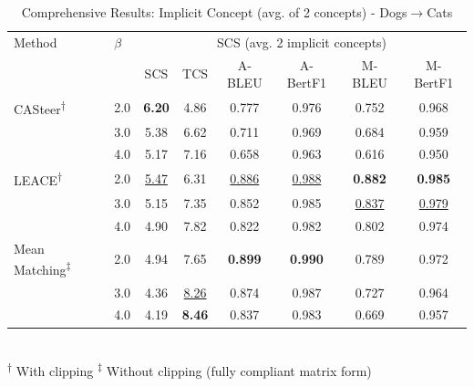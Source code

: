 \begin{table}[htbp]
\centering
\caption{Comprehensive Results: Implicit Concept (avg. of 2 concepts) - Dogs$\to$Cats}
\label{tab:implicitconcept_man_s_best_friend_dogstocats_avg2}
\begin{tabular}{l|l|cccccc|}
\hline
Method & $\beta$ & \multicolumn{6}{c|}{SCS (avg. 2 implicit concepts)} \\
 &  & SCS & TCS & A-BLEU & A-BertF1 & M-BLEU & M-BertF1 \\
\hline
CASteer\textsuperscript{†} & 2.0 & \textbf{6.20} & 4.86 & 0.777 & 0.976 & 0.752 & 0.968 \\
 & 3.0 & 5.38 & 6.62 & 0.711 & 0.969 & 0.684 & 0.959 \\
 & 4.0 & 5.17 & 7.16 & 0.658 & 0.963 & 0.616 & 0.950 \\
\hline
LEACE\textsuperscript{†} & 2.0 & \underline{5.47} & 6.31 & \underline{0.886} & \underline{0.988} & \textbf{0.882} & \textbf{0.985} \\
 & 3.0 & 5.15 & 7.35 & 0.852 & 0.985 & \underline{0.837} & \underline{0.979} \\
 & 4.0 & 4.90 & 7.82 & 0.822 & 0.982 & 0.802 & 0.974 \\
\hline
Mean Matching\textsuperscript{‡} & 2.0 & 4.94 & 7.65 & \textbf{0.899} & \textbf{0.990} & 0.789 & 0.972 \\
 & 3.0 & 4.36 & \underline{8.26} & 0.874 & 0.987 & 0.727 & 0.964 \\
 & 4.0 & 4.19 & \textbf{8.46} & 0.837 & 0.983 & 0.669 & 0.957 \\
\hline
\end{tabular}
\\[0.5em]
\footnotesize
\textsuperscript{†} With clipping \quad \textsuperscript{‡} Without clipping (fully compliant matrix form)
\end{table}